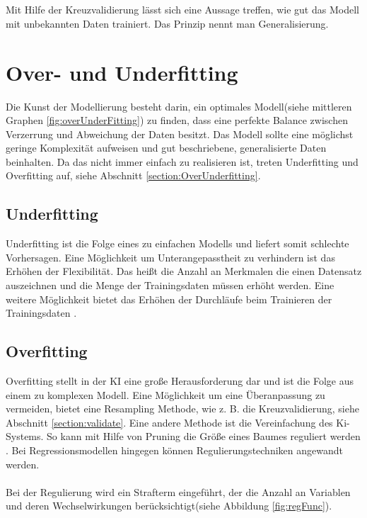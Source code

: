 \documentclass[12pt,oneside,a4paper,parskip]{scrbook}
\begin{document}
\\\\
Mit Hilfe der Kreuzvalidierung lässt sich eine Aussage treffen, wie gut das Modell mit unbekannten Daten trainiert. Das Prinzip nennt man Generalisierung.

\section{Over- und Underfitting}
\label{section:preventData}
Die Kunst der Modellierung besteht darin, ein optimales Modell(siehe mittleren Graphen \ref{fig:overUnderFitting}) zu finden, dass eine perfekte Balance zwischen Verzerrung und Abweichung der Daten besitzt. Das Modell sollte eine möglichst geringe Komplexität aufweisen und gut beschriebene, generalisierte Daten beinhalten. Da das nicht immer einfach zu realisieren ist, treten Underfitting und Overfitting auf, siehe Abschnitt \ref{section:OverUnderfitting}.

\subsection{Underfitting}
Underfitting ist die Folge eines zu einfachen Modells und liefert somit schlechte Vorhersagen. Eine Möglichkeit um Unterangepasstheit zu verhindern ist das Erhöhen der Flexibilität. Das heißt die Anzahl an Merkmalen die einen Datensatz auszeichnen und die Menge der Trainingsdaten müssen erhöht werden. Eine weitere Möglichkeit bietet das Erhöhen der Durchläufe beim Trainieren der Trainingsdaten \cite{amazonOverUnderfitting}.

\subsection{Overfitting}
Overfitting stellt in der KI eine große Herausforderung dar und ist die Folge aus einem zu komplexen Modell. Eine Möglichkeit um eine Überanpassung zu vermeiden, bietet eine Resampling Methode, wie z. B. die Kreuzvalidierung, siehe Abschnitt \ref{section:validate}.
Eine andere Methode ist die Vereinfachung des Ki-Systems. So kann mit Hilfe von Pruning die Größe eines Baumes reguliert werden \cite{overUnderfittingNovu}. Bei Regressionsmodellen hingegen können Regulierungstechniken angewandt werden.
\\\\
Bei der Regulierung wird ein Strafterm eingeführt, der die Anzahl an Variablen und deren Wechselwirkungen berücksichtigt(siehe Abbildung \ref{fig:regFunc}).
\end{document}
